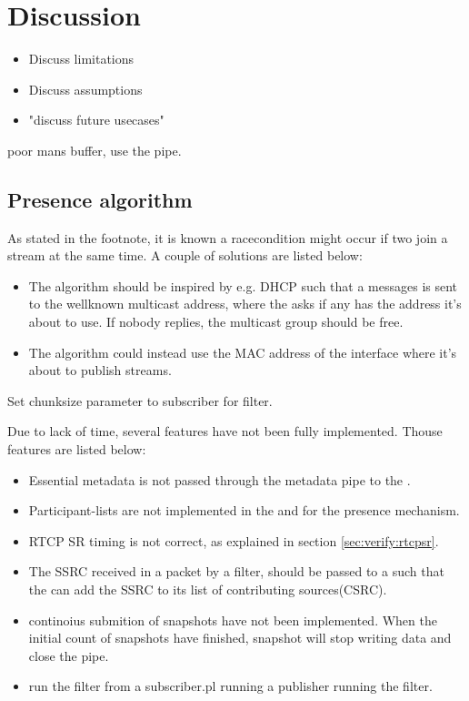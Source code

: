 \chapter{Discussion}\label{chp:discussion}

\begin{itemize}
	\item Discuss limitations
	\item Discuss assumptions
	\item "discuss future usecases"
\end{itemize}

poor mans buffer, use the pipe.


\section{Presence algorithm}
As stated in the footnote, it is known a racecondition might occur if two \pubs{} join a stream at the same time. A couple of solutions are listed below:
\begin{itemize}
	\item The algorithm should be inspired by e.g. \ac{DHCP} such that a messages is sent to the wellknown multicast address, where the \pub{} asks if any has the address it's about to use. If nobody replies, the multicast group should be free.
	
	\item The algorithm could instead use the \ac{MAC} address of the interface where it's about to publish streams. 
\end{itemize}

Set chunksize parameter to subscriber for filter.

Due to lack of time, several features have not been fully implemented.
Thouse features are listed below:
\begin{itemize}
	\item Essential metadata is not passed through the metadata pipe to the \con{}.
	\item Participant-lists are not implemented in the \sub{} and \pub{} for the presence mechanism.
	\item RTCP SR timing is not correct, as explained in section \ref{sec:verify:rtcpsr}.
	\item The SSRC received in a packet by a filter, should be passed to a  such that the \pub{} can add the SSRC to its list of contributing sources(CSRC).
	\item continoius submition of snapshots have not been implemented. When the initial count of snapshots have finished, snapshot will stop writing data and close the pipe.
	\item run the filter from a subscriber.pl running a publisher running the filter.
\end{itemize}

